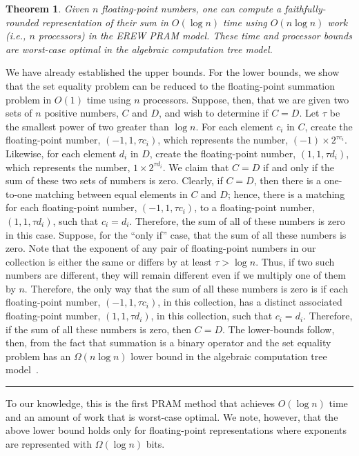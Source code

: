 \documentclass[11pt]{article}
\newtheorem{theorem}{Theorem}\newtheorem{lemma}[theorem]{Lemma}
\newenvironment{proof}{\noindent{\bf Proof:}}{\hspace*{\fill}\rule{6pt}{6pt}\bigskip}
\begin{document}
\begin{theorem}
Given $n$ floating-point numbers, one can compute a 
faithfully-rounded representation
of their sum in $O(\log n)$ time using $O(n\log n)$ work (i.e., $n$ processors)
in the EREW PRAM model.
These time and processor bounds are worst-case optimal 
in the algebraic computation tree model.
\end{theorem}
\begin{proof}
We have already established the upper bounds.
For the lower bounds, we show that the set equality problem can be reduced
to the floating-point summation problem in $O(1)$ time using $n$ processors.
Suppose, then, that we are given two sets of $n$ positive numbers, $C$ and $D$,
and wish to determine if $C=D$.
Let $\tau$ be the smallest power of two greater than $\log n$.
For each element $c_i$ in $C$, create the floating-point number, 
$(-1,1,\tau c_i)$, which represents the number, $(-1)\times 2^{\tau c_i}$.
Likewise,
for each element $d_i$ in $D$, create the floating-point number, 
$(1,1,\tau d_i)$, which represents the number, $1\times 2^{\tau d_i}$.
We claim that $C=D$ if and only if the sum of these two sets 
of numbers is zero.
Clearly, if $C=D$, then there is a one-to-one matching between equal elements 
in $C$ and $D$; hence, there is a matching for 
each floating-point number, $(-1,1,\tau c_i)$, to
a floating-point number, $(1,1,\tau d_i)$, such that $c_i=d_i$.
Therefore, the sum of all of these numbers is zero in this case.
Suppose, for the ``only if'' case, that the sum of all these numbers is zero.
Note that
the exponent of any pair of floating-point numbers in our collection is 
either the same or differs by at least $\tau > \log n$.
Thus, if two such numbers are different, they will remain different
even if we multiply one of them by $n$.
Therefore, the only way that the sum of all these numbers is zero is if each
floating-point number, $(-1,1,\tau c_i)$, in this collection,
has a distinct associated 
floating-point number,
$(1,1,\tau d_i)$, in this collection, such 
that $c_i=d_i$.
Therefore, if the sum of all these numbers is zero, then $C=D$.
The lower-bounds follow, then, from the fact that summation
is a binary operator and the set equality problem
has an $\Omega(n\log n)$ lower bound in the algebraic computation
tree model~\cite{Ben-Or:1983}.
\end{proof}

To our knowledge, this is the first PRAM method that achieves $O(\log n)$
time and an amount of work that is worst-case optimal.
We note, however, that the above lower bound holds only for floating-point
representations where exponents are represented with $\Omega(\log n)$ bits.
\end{document}
